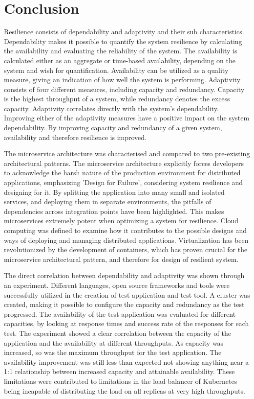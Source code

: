 \chapter{Conclusion}
\label{ch:conclusion}

Resilience consists of dependability and adaptivity and their sub characteristics. Dependability makes it possible to quantify the system resilience by calculating the availability and evaluating the reliability of the system. The availability is calculated either as an aggregate or time-based availability, depending on the system and wish for quantification. Availability can be utilized as a quality measure, giving an indication of how well the system is performing. 
Adaptivity consists of four different measures, including capacity and redundancy. Capacity is the highest throughput of a system, while redundancy denotes the excess capacity. Adaptivity correlates directly with the system's dependability. Improving either of the adaptivity measures have a positive impact on the system dependability. By improving capacity and redundancy of a given system, availability and therefore resilience is improved.

The microservice architecture was characterised and compared to two pre-existing architectural patterns. The microservice architecture explicitly forces developers to acknowledge the harsh nature of the production environment for distributed applications, emphasizing 'Design for Failure', considering system resilience and designing for it. By splitting the application into many small and isolated services, and deploying them in separate environments, the pitfalls of dependencies across integration points have been highlighted. This makes microservices extremely potent when optimizing a system for resilience. Cloud computing was defined to examine how it contributes to the possible designs and ways of deploying and managing distributed applications. Virtualization has been revolutionized by the development of containers, which has proven crucial for the microservice architectural pattern, and therefore for design of resilient system.

The direct correlation between dependability and adaptivity was shown through an experiment. Different languages, open source frameworks and tools were successfully utilized in the creation of test application and test tool. A cluster was created, making it possible to configure the capacity and redundancy as the test progressed. The availability of the test application was evaluated for different capacities, by looking at response times and success rate of the responses for each test. The experiment showed a clear correlation between the capacity of the application and the availability at different throughputs. As capacity was increased, so was the maximum throughput for the test application. The availability improvement was still less than expected not showing anything near a 1:1 relationship between increased capacity and attainable availability. These limitations were contributed to limitations in the load balancer of Kubernetes being incapable of distributing the load on all replicas at very high throughputs.


